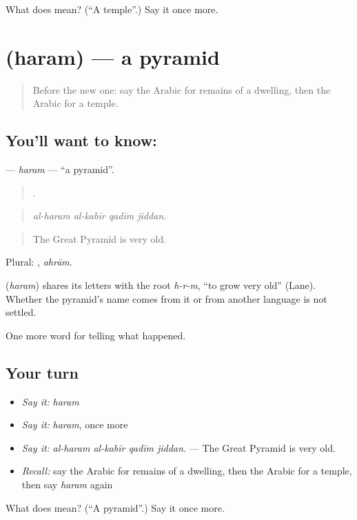 \begin{tcolorbox}[breakable,colback=teal!4,colframe=teal!35!black,title={Before you move on}]
What does  mean? (\textquotedblleft{}A temple\textquotedblright{}.) Say it once more.
\end{tcolorbox}
\section[\texorpdfstring{\ar{هرم} (haram)}{هرم (haram)}]{ (haram) — a pyramid}

\label{lesson:AR-C318-haram}



\begin{quote}
Before the new one: say the Arabic for remains of a dwelling, then the Arabic for a temple.
\end{quote}

\subsection*{You'll want to know: }
\textbf{} — \emph{haram} — \textquotedblleft{}a pyramid\textquotedblright{}.

\begin{quote}
   .
\end{quote}

\begin{quote}
\emph{al-haram al-kabīr qadīm jiddan.}
\end{quote}

\begin{quote}
The Great Pyramid is very old.
\end{quote}

Plural: , \emph{ahrām}.

\begin{cousinweb}
\textbf{} (\emph{haram}) shares its letters with the root \emph{h-r-m}, \textquotedblleft{}to grow very old\textquotedblright{} (Lane). Whether the pyramid's name comes from it or from another language is not settled.
\end{cousinweb}

\begin{grammarlens}[title={What you've built}]
One more word for telling what happened.
\end{grammarlens}

\subsection*{Your turn}
\begin{itemize}
\raggedright
  \item \emph{Say it:} \emph{haram}
  \item \emph{Say it:} \emph{haram}, once more
  \item \emph{Say it:} \emph{al-haram al-kabīr qadīm jiddan.} — The Great Pyramid is very old.
  \item \emph{Recall:} say the Arabic for remains of a dwelling, then the Arabic for a temple, then say \emph{haram} again
\end{itemize}

\begin{tcolorbox}[breakable,colback=teal!4,colframe=teal!35!black,title={Before you move on}]
What does  mean? (\textquotedblleft{}A pyramid\textquotedblright{}.) Say it once more.
\end{tcolorbox}
